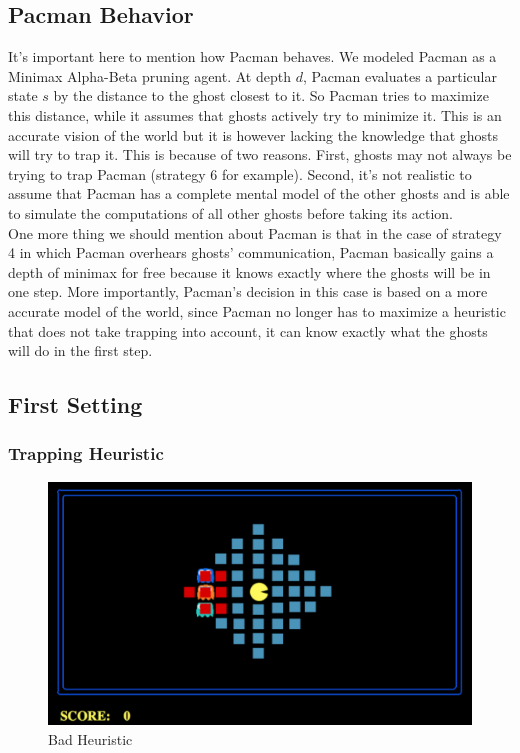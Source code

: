 \documentclass[11pt]{article}
\begin{document}
\begin{multicols}{2}
\subsection{Pacman Behavior}
It's important here to mention how Pacman behaves. We modeled Pacman as a Minimax Alpha-Beta pruning agent. At depth $d$, Pacman evaluates a particular state $s$ by the distance to the ghost closest to it. So Pacman tries to maximize this distance, while it assumes that ghosts actively try to minimize it. This is an accurate vision of the world but it is however lacking the knowledge that ghosts will try to trap it. This is because of two reasons. First, ghosts may not always be trying to trap Pacman (strategy 6 for example). Second, it's not realistic to assume that Pacman has a complete mental model of the other ghosts and is able to simulate the computations of all other ghosts before taking its action.\\
One more thing we should mention about Pacman is that in the case of strategy 4 in which Pacman overhears ghosts' communication, Pacman basically gains a depth of minimax for free because it knows exactly where the ghosts will be in one step. More importantly, Pacman's decision in this case is based on a more accurate model of the world, since Pacman no longer has to maximize a heuristic that does not take trapping into account, it can know exactly what the ghosts will do in the first step.

\subsection{First Setting}
\subsubsection{Trapping Heuristic}

\begin{figure}
	\includegraphics[width=\columnwidth]{badheuristic.png}
	\caption{Bad Heuristic}
	\label{fig:badheuristic}
\end{figure}


\end{multicols}
\end{document}
